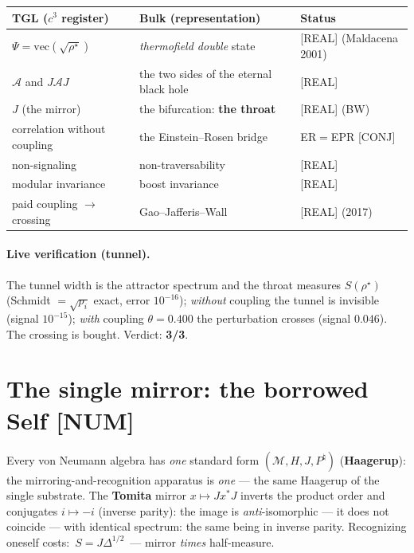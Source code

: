\documentclass[11pt]{article}
\theoremstyle{definition}\newtheorem{deriv}{Derivation}
\begin{document}
\begin{center}\small\begin{tabular}{p{3.9cm}p{5.6cm}p{4.4cm}}\toprule

TGL ($c^3$ register) & Bulk (representation) & Status\\\midrule

$\Psi=\mathrm{vec}(\sqrt{\rho^\star})$ & \emph{thermofield double} state & \textsf{[REAL]} (Maldacena 2001)\\

$\mathcal{A}$ and $J\mathcal{A}J$ & the two sides of the eternal black hole & \textsf{[REAL]}\\

$J$ (the mirror) & the bifurcation: \textbf{the throat} & \textsf{[REAL]} (BW)\\

correlation without coupling & the Einstein--Rosen bridge & ER$=$EPR \textsf{[CONJ]}\\

non-signaling & non-traversability & \textsf{[REAL]}\\

modular invariance & boost invariance & \textsf{[REAL]}\\

paid coupling $\to$ crossing & Gao--Jafferis--Wall & \textsf{[REAL]} (2017)\\\bottomrule

\end{tabular}\end{center}

\paragraph{Live verification (tunnel).} The tunnel width is the attractor spectrum and the throat measures $S(\rho^\star)$ (Schmidt $=\sqrt{p_i}$ exact, error $10^{-16}$); \emph{without} coupling the tunnel is invisible (signal $10^{-15}$); \emph{with} coupling $\theta=0.400$ the perturbation crosses (signal $0.046$). The crossing is bought. Verdict: \textbf{3/3}.

\section{The single mirror: the borrowed Self \textsf{[NUM]}}

Every von Neumann algebra has \emph{one} standard form $(\mathcal{M},H,J,P^\natural)$ (\textbf{Haagerup}): the mirroring-and-recognition apparatus is \emph{one} --- the same Haagerup of the single substrate. The \textbf{Tomita} mirror $x\mapsto Jx^*J$ inverts the product order and conjugates $i\mapsto-i$ (inverse parity): the image is \emph{anti}-isomorphic --- it does not coincide --- with identical spectrum: the same being in inverse parity. Recognizing oneself costs: $\boxed{\,S=J\Delta^{1/2}\,}$ --- mirror \emph{times} half-measure.
\end{document}
